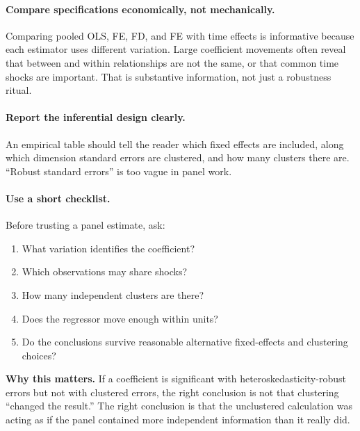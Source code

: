 \paragraph{Compare specifications economically, not mechanically.}
Comparing pooled \ac{OLS}, FE, FD, and FE with time effects is informative because each estimator uses different variation. Large coefficient movements often reveal that between and within relationships are not the same, or that common time shocks are important. That is substantive information, not just a robustness ritual.

\paragraph{Report the inferential design clearly.}
An empirical table should tell the reader which fixed effects are included, along which dimension standard errors are clustered, and how many clusters there are. ``Robust standard errors'' is too vague in panel work.

\paragraph{Use a short checklist.}
Before trusting a panel estimate, ask:
\begin{enumerate}
\item What variation identifies the coefficient?
\item Which observations may share shocks?
\item How many independent clusters are there?
\item Does the regressor move enough within units?
\item Do the conclusions survive reasonable alternative fixed-effects and clustering choices?
\end{enumerate}

\begin{boxD}
\textbf{Why this matters.}
If a coefficient is significant with heteroskedasticity-robust errors but not with clustered errors, the right conclusion is not that clustering ``changed the result.'' The right conclusion is that the unclustered calculation was acting as if the panel contained more independent information than it really did.
\end{boxD}

